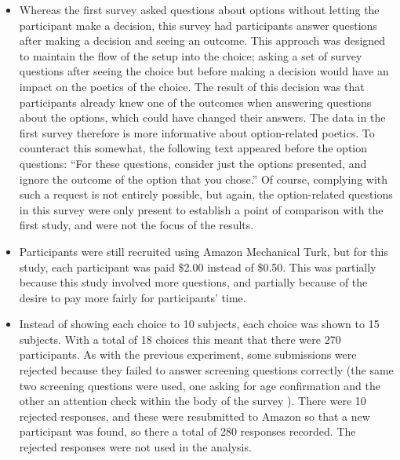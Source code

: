 \begin{itemize}
  \item%
    Whereas the first survey asked questions about options without letting the participant make a decision, this survey had participants answer questions after making a decision and seeing an outcome.
    This approach was designed to maintain the flow of the setup into the choice; asking a set of survey questions after seeing the choice but before making a decision would have an impact on the poetics of the choice.
    The result of this decision was that participants already knew one of the outcomes when answering questions about the options, which could have changed their answers.
    The data in the first survey therefore is more informative about option-related poetics.
    To counteract this somewhat, the following text appeared before the option questions:
    ``For these questions, consider just the options presented, and ignore the outcome of the option that you chose.''
    Of course, complying with such a request is not entirely possible, but again, the option-related questions in this survey were only present to establish a point of comparison with the first study, and were not the focus of the results.

  \item%
    Participants were still recruited using Amazon Mechanical Turk, but for this study, each participant was paid \$2.00 instead of \$0.50.
    This was partially because this study involved more questions, and partially because of the desire to pay more fairly for participants' time.

  \item%
    Instead of showing each choice to 10 subjects, each choice was shown to 15 subjects.
    With a total of 18 choices this meant that there were 270 participants.
    As with the previous experiment, some submissions were rejected because they failed to answer screening questions correctly (the same two screening questions were used, one asking for age confirmation and the other an attention check within the body of the survey ).
    There were 10 rejected responses, and these were resubmitted to Amazon so that a new participant was found, so there a total of 280 responses recorded.
    The rejected responses were not used in the analysis.


\end{itemize}
